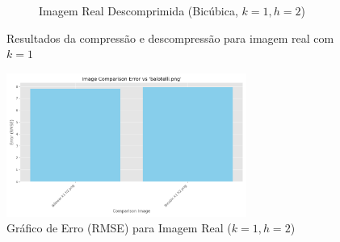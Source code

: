 \documentclass[12pt, a4paper]{article}
\begin{document}
\begin{figure}[H]
\begin{subfigure}[b]{0.45\textwidth}
        \caption{Imagem Real Descomprimida (Bicúbica, $k=1, h=2$)}
        \label{fig:selva_bicubic_k1}
    \end{subfigure}
    \caption{Resultados da compressão e descompressão para imagem real com $k=1$}
    \label{fig:selva_results_k1}
\end{figure}

\begin{figure}[H]
    \centering
    \includegraphics[width=0.7\textwidth]{results/case_6/error_graph.png}
    \caption{Gráfico de Erro (RMSE) para Imagem Real ($k=1, h=2$)}
    \label{fig:selva_error_graph_k1}
\end{figure}
\end{document}
